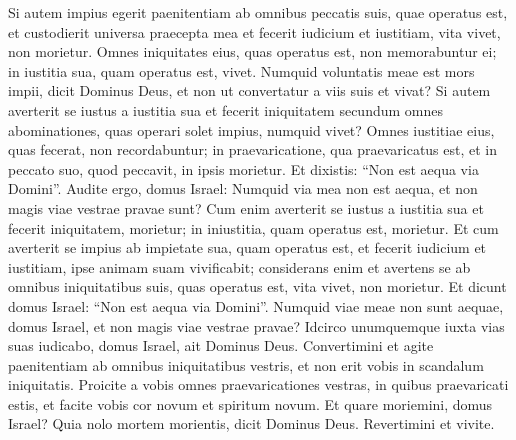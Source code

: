 \begin{biblechapter}
\verse Si autem impius egerit paenitentiam ab omnibus peccatis suis, quae operatus est, et custodierit universa praecepta mea et fecerit iudicium et iustitiam, vita vivet, non morietur. 
\verse Omnes iniquitates eius, quas operatus est, non memorabuntur ei; in iustitia sua, quam operatus est, vivet. 
\verse Numquid voluntatis meae est mors impii, dicit Dominus Deus, et non ut convertatur a viis suis et vivat? 
\verse Si autem averterit se iustus a iustitia sua et fecerit iniquitatem secundum omnes abominationes, quas operari solet impius, numquid vivet? Omnes iustitiae eius, quas fecerat, non recordabuntur; in praevaricatione, qua praevaricatus est, et in peccato suo, quod peccavit, in ipsis morietur. 
\verse Et dixistis: “Non est aequa via Domini”. Audite ergo, domus Israel: Numquid via mea non est aequa, et non magis viae vestrae pravae sunt? 
\verse Cum enim averterit se iustus a iustitia sua et fecerit iniquitatem, morietur; in iniustitia, quam operatus est, morietur. 
\verse Et cum averterit se impius ab impietate sua, quam operatus est, et fecerit iudicium et iustitiam, ipse animam suam vivificabit;  
\verse considerans enim et avertens se ab omnibus iniquitatibus suis, quas operatus est, vita vivet, non morietur. 
\verse Et dicunt domus Israel: “Non est aequa via Domini”. Numquid viae meae non sunt aequae, domus Israel, et non magis viae vestrae pravae? 
\verse Idcirco unumquemque iuxta vias suas iudicabo, domus Israel, ait Dominus Deus. Convertimini et agite paenitentiam ab omnibus iniquitatibus vestris, et non erit vobis in scandalum iniquitatis. 
\verse Proicite a vobis omnes praevaricationes vestras, in quibus praevaricati estis, et facite vobis cor novum et spiritum novum. Et quare moriemini, domus Israel? 
\verse Quia nolo mortem morientis, dicit Dominus Deus. Revertimini et vivite. 
\end{biblechapter}

